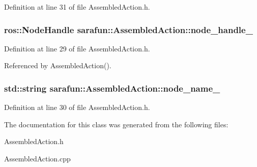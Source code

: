 Definition at line 31 of file Assembled\-Action.\-h.

\hypertarget{classsarafun_1_1AssembledAction_ae97c585b30dd24e64cc08f78c08e52c5_ae97c585b30dd24e64cc08f78c08e52c5}{
\subsubsection[{node\-\_\-handle\-\_\-}]{\setlength{\rightskip}{0pt plus 5cm}ros\-::\-Node\-Handle sarafun\-::\-Assembled\-Action\-::node\-\_\-handle\-\_\-\hspace{0.3cm}{\ttfamily [private]}}}\label{classsarafun_1_1AssembledAction_ae97c585b30dd24e64cc08f78c08e52c5_ae97c585b30dd24e64cc08f78c08e52c5}


Definition at line 29 of file Assembled\-Action.\-h.



Referenced by Assembled\-Action().

\hypertarget{classsarafun_1_1AssembledAction_a693b73bd880c4b9c193dea5ab62c1df8_a693b73bd880c4b9c193dea5ab62c1df8}{
\subsubsection[{node\-\_\-name\-\_\-}]{\setlength{\rightskip}{0pt plus 5cm}std\-::string sarafun\-::\-Assembled\-Action\-::node\-\_\-name\-\_\-\hspace{0.3cm}{\ttfamily [private]}}}\label{classsarafun_1_1AssembledAction_a693b73bd880c4b9c193dea5ab62c1df8_a693b73bd880c4b9c193dea5ab62c1df8}


Definition at line 30 of file Assembled\-Action.\-h.



The documentation for this class was generated from the following files\-:\begin{DoxyCompactItemize}
\item 
Assembled\-Action.\-h\item 
Assembled\-Action.\-cpp\end{DoxyCompactItemize}
